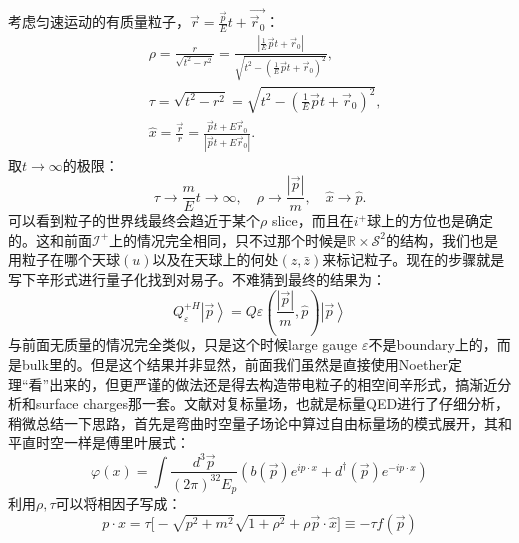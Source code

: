 考虑匀速运动的有质量粒子，$\vec{r}=\frac{\vec{p}}{E}t+\vec{\vec{r}_{0}}$：
\begin{equation}
	\begin{aligned}
		&\rho=\frac{r}{\sqrt{t^{2}-r^{2}}}=\frac{|\frac{1}{E}\vec{p}t+\vec{r}_{0}|}{\sqrt{t^{2}-\left(\frac{1}{E}\vec{p}t+\vec{r}_{0}\right)^{2}}}, \\
		&\tau=\sqrt{t^{2}-r^{2}}=\sqrt{t^{2}-\left(\frac{1}{E}\vec{p}t+\vec{r}_{0}\right)^{2}}, \\
		&\hat{x}=\frac{\vec{r}}{r}=\frac{\vec{p}t+E\vec{r}_{0}}{|\vec{p}t+E\vec{r}_{0}|}.
	\end{aligned}
\end{equation}
取$t\to\infty$的极限：
\begin{equation}
	\tau\to\frac{m}Et\to\infty,\quad\rho\to\frac{|\vec{p}|}m,\quad\hat{x}\to\hat{p}.
\end{equation}
可以看到粒子的世界线最终会趋近于某个$\rho$ slice，而且在$i^+$球上的方位也是确定的。这和前面$\mathcal{I}^+$上的情况完全相同，只不过那个时候是$\mathbb{R}\times \mathcal{S}^2$的结构，我们也是用粒子在哪个天球$(u)$以及在天球上的何处$(z,\bar z)$来标记粒子。现在的步骤就是写下辛形式进行量子化找到对易子。不难猜到最终的结果为：
\begin{equation}\label{guess}
	Q_{\varepsilon}^{+H}\left|\vec{p}\right>=Q\varepsilon\left(\frac{\left|\vec{p}\right|}{m},\hat{p}\right)\left|\vec{p}\right\rangle 
\end{equation}
与前面无质量的情况完全类似，只是这个时候large gauge $\varepsilon$不是boundary上的，而是bulk里的。但是这个结果并非显然，前面我们虽然是直接使用Noether定理“看”出来的，但更严谨的做法还是得去构造带电粒子的相空间辛形式，搞渐近分析和surface charges那一套。文献\cite{Campiglia:2015qka}对复标量场，也就是标量QED进行了仔细分析，稍微总结一下思路，首先是弯曲时空量子场论中算过自由标量场的模式展开，其和平直时空一样是傅里叶展式：
\begin{equation}
	\varphi(x)=\int\frac{d^3\vec{p}}{(2\pi)^32E_p}(b(\vec{p})e^{ip\cdot x}+d^\dagger(\vec{p})e^{-ip\cdot x})
\end{equation}
利用$\rho,\tau$可以将相因子写成：
\begin{equation}
	p\cdot x=\tau\Big[-\sqrt{p^2+m^2}\sqrt{1+\rho^2}+\rho\vec{p}\cdot\hat{x}\Big]\equiv-\tau f(\vec{p})
\end{equation}
